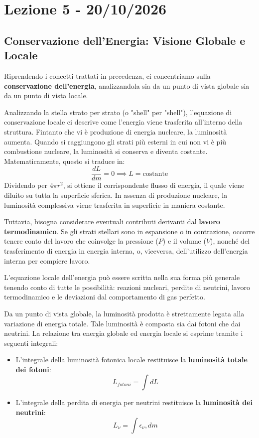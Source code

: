 \chapter{Lezione 5 - 20/10/2026}

\section{Conservazione dell'Energia: Visione Globale e Locale}

Riprendendo i concetti trattati in precedenza, ci concentriamo sulla \textbf{conservazione dell'energia}, analizzandola sia da un punto di vista globale sia da un punto di vista locale.

Analizzando la stella strato per strato (o "shell" per "shell"), l'equazione di conservazione locale ci descrive come l'energia viene trasferita all'interno della struttura. Fintanto che vi è produzione di energia nucleare, la luminosità aumenta. Quando si raggiungono gli strati più esterni in cui non vi è più combustione nucleare, la luminosità si conserva e diventa costante. Matematicamente, questo si traduce in:
\begin{equation}
\frac{dL}{dm} = 0 \implies L = \text{costante}
\end{equation}
Dividendo per $4\pi r^2$, si ottiene il corrispondente flusso di energia, il quale viene diluito su tutta la superficie sferica. In assenza di produzione nucleare, la luminosità complessiva viene trasferita in superficie in maniera costante.

Tuttavia, bisogna considerare eventuali contributi derivanti dal \textbf{lavoro termodinamico}. Se gli strati stellari sono in espansione o in contrazione, occorre tenere conto del lavoro che coinvolge la pressione ($P$) e il volume ($V$), nonché del trasferimento di energia in energia interna, o, viceversa, dell'utilizzo dell'energia interna per compiere lavoro.

L'equazione locale dell'energia può essere scritta nella sua forma più generale tenendo conto di tutte le possibilità: reazioni nucleari, perdite di neutrini, lavoro termodinamico e le deviazioni dal comportamento di gas perfetto.

Da un punto di vista globale, la luminosità prodotta è strettamente legata alla variazione di energia totale. Tale luminosità è composta sia dai fotoni che dai neutrini. La relazione tra energia globale ed energia locale si esprime tramite i seguenti integrali:
\begin{itemize}
\item L'integrale della luminosità fotonica locale restituisce la \textbf{luminosità totale dei fotoni}:
\begin{equation}
L_{fotoni} = \int dL
\end{equation}
\item L'integrale della perdita di energia per neutrini restituisce la \textbf{luminosità dei neutrini}:
\begin{equation}
L_{\nu} = \int \epsilon_{\nu} , dm
\end{equation}
\end{itemize}

